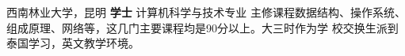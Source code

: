 {%
 西南林业大学，昆明}
 {%
  \textbf{学士} 计算机科学与技术专业}
 {%
   主修课程数据结构、操作系统、组成原理、网络等，这几门主要课程均是90分以上。大三时作为学
   校交换生派到泰国学习，英文教学环境。
 }
